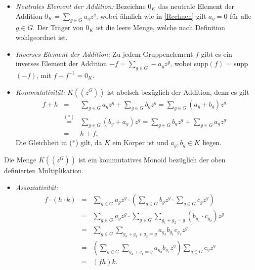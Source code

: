 {\begin{itemize}
\item \textit{Neutrales Element der Addition:} Bezeichne $0_K$ das neutrale Element der Addition $0_K = \sum_{g \in G}^{} a_g z^g$, wobei ähnlich wie in \ref{Rechnen} gilt $a_g = 0$ für alle $g \in G$. Der Träger von $0_K$ ist die leere Menge, welche nach Definition wohlgeordnet ist.
\item \textit{Inverses Element der Addition:} Zu jedem Gruppenelement $f$ gibt es ein inverses Element der Addition $-f = \sum_{g \in G}^{} -a_g z^g$, wobei supp$(f)$ = supp$(-f)$, mit $f+ f^{-1} = 0_K$.
\item \textit{Kommutativität:} 
$K\left(\left(z^{G}\right)\right)$ ist abelsch bezüglich der Addition, denn es gilt 
\begin{eqnarray*}
f+ h &=& \sum_{g \in G}^{} a_gz^g + \sum_{g \in G}^{} b_gz^g 
= \sum_{g \in G}^{} \left(a_g  + b_g\right) z^g \\
&\stackrel{\mathrm{(*)}}=& \sum_{g \in G}^{} \left(b_g  + a_g\right) z^g 
= \sum_{g \in G}^{} b_gz^g +  \sum_{g \in G}^{} a_gz^g \\
&=& h + f.
\end{eqnarray*}
Die Gleichheit in (*) gilt, da $K$ ein Körper ist und $a_g, b_g \in K$ liegen.  
\end{itemize}
%
%
%
%
%
%
Die Menge $K\left(\left(z^{G}\right)\right)$ ist ein kommutatives Monoid bezüglich der oben definierten Multiplikation.
\begin{itemize}
\item \textit{Assoziativität:}
\begin{eqnarray*}
 f\cdot \left(h \cdot k\right) &= & \sum_{g \in G}^{} a_g z^g \cdot \left( \sum_{g \in G}^{} b_g z^g \cdot \sum_{g \in G}^{}c_g z^g \right) \\
&=& \sum_{g \in G}^{} a_g z^g \cdot \sum_{g \in G}^{}\sum_{g_1 + g_2 = g}^{} \left(b_{g_1} \cdot c_{g_2}\right) z^g \\
&=&  \sum_{g \in G}^{}\sum_{g_3 + g_1 + g_2  = g}^{} a_{g_3} b_{g_1} c_{g_2} z^g \\
& =& \left(\sum_{g \in G}^{}\sum_{g_3 + g_1 = g}^{} a_{g_3} b_{g_1}z^g\right) \sum_{g \in G}^{}c_g z^g   \\
&=& \left(fh\right) k .
\end{eqnarray*}
%
%
%
%
%

\end{itemize}}
